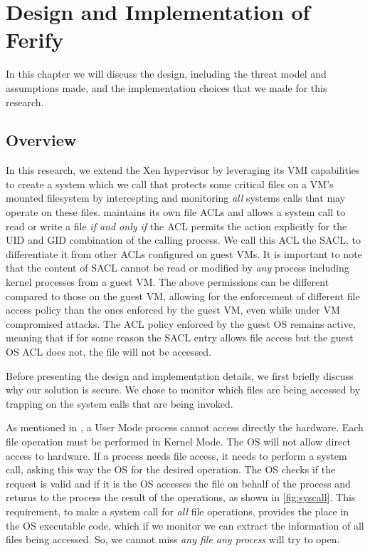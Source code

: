 \acresetall

\chapter{Design and Implementation of Ferify}\label{ch:chapter3}

In this chapter we will discuss the design, including the threat model and assumptions made, and the implementation choices that we made for this research.	

\section{Overview}\label{sec:overview}

\par In this research, we extend the Xen hypervisor by leveraging its \ac{VMI} capabilities to create a system which we call  that protects some critical files on a \ac{VM}'s mounted filesystem by intercepting and monitoring \emph{all} systems calls that may operate on these files.  maintains its own file \acp{ACL} and allows a system call to read or write a file \emph{if and only if} the \ac{ACL} permits the action explicitly for the \ac{UID} and \ac{GID} combination of the calling process. We call this \ac{ACL} the \ac{SACL}, to differentiate it from other \acp{ACL} configured on guest \acp{VM}. It is important to note that the content of \ac{SACL} cannot be read or modified by \emph{any} process including kernel processes from a guest \ac{VM}. The above permissions can be different compared to those on the guest \ac{VM}, allowing for the enforcement of different file access policy than the ones enforced by the guest \ac{VM}, even while under \ac{VM} compromised attacks. The \ac{ACL} policy enforced by the guest \ac{OS} remains active, meaning that if for some reason the \ac{SACL} entry allows file access but the guest \ac{OS} \ac{ACL} does not, the file will not be accessed.

\par Before presenting the design and implementation details, we first briefly discuss why our solution is secure. We chose to monitor which files are being accessed by trapping on the system calls that are being invoked. 

\par As mentioned in \cite{linuxkernel}, a User Mode process cannot access directly the hardware. Each file operation must be performed in Kernel Mode. The \ac{OS} will not allow direct access to hardware. If a process needs file access, it needs to perform a system call, asking this way the \ac{OS} for the desired operation. The \ac{OS} checks if the request is valid and if it is the \ac{OS} accesses the file on behalf of the process and returns to the process the result of the operations, as shown in \ref{fig:syscall}. This requirement, to make a system call for \emph{all} file operations, provides the place in the \ac{OS} executable code, which if we monitor we can extract the information of all files being accessed. So, we cannot miss \emph{any file any process} will try to open.


